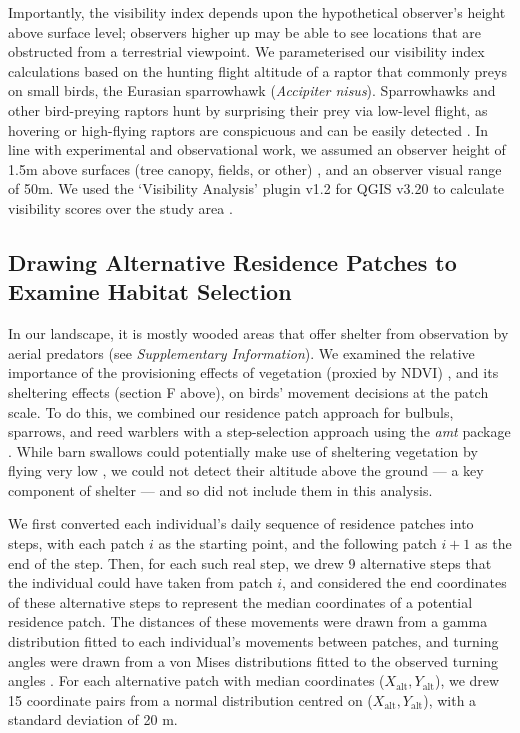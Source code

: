 Importantly, the visibility index depends upon the hypothetical observer's height above surface level; observers higher up may be able to see locations that are obstructed from a terrestrial viewpoint.
We parameterised our visibility index calculations based on the hunting flight altitude of a raptor that commonly preys on small birds, the Eurasian sparrowhawk (\textit{Accipiter nisus}).
Sparrowhawks and other bird-preying raptors hunt by surprising their prey via low-level flight, as hovering or high-flying raptors are conspicuous and can be easily detected \parencite{krams2001,krams2020}.
In line with experimental and observational work, we assumed an observer height of 1.5m above surfaces (tree canopy, fields, or other) \citep{seress2011,krams2020}, and an observer visual range of 50m.
We used the `Visibility Analysis' plugin v1.2 for QGIS v3.20 to calculate visibility scores over the study area \citep{cuckovic2016}.

\subsection*{Drawing Alternative Residence Patches to Examine Habitat Selection}

In our landscape, it is mostly wooded areas that offer shelter from observation by aerial predators (see \textit{Supplementary Information}).
We examined the relative importance of the provisioning effects of vegetation (proxied by NDVI) \parencite{pettorelli2011}, and its sheltering effects (section F above), on birds' movement decisions at the patch scale.
To do this, we combined our residence patch approach for bulbuls, sparrows, and reed warblers with a step-selection approach \citep{thurfjell2014,avgar2016} using the \textit{amt} package \citep{signer2019}.
While barn swallows could potentially make use of sheltering vegetation by flying very low \parencite{warrick2016}, we could not detect their altitude above the ground --- a key component of shelter --- and so did not include them in this analysis.

We first converted each individual's daily sequence of residence patches into steps, with each patch $i$ as the starting point, and the following patch $i+1$ as the end of the step.
Then, for each such real step, we drew 9 alternative steps that the individual could have taken from patch $i$, and considered the end coordinates of these alternative steps to represent the median coordinates of a potential residence patch.
The distances of these movements were drawn from a gamma distribution fitted to each individual's movements between patches, and turning angles were drawn from a von Mises distributions fitted to the observed turning angles \citep{signer2019}.
For each alternative patch with median coordinates ($X_\text{alt}, Y_\text{alt}$), we drew 15 coordinate pairs from a normal distribution centred on ($X_\text{alt}, Y_\text{alt}$), with a standard deviation of 20 m.

